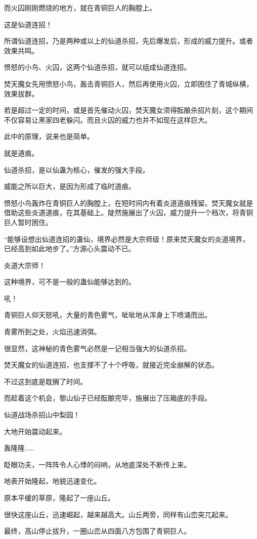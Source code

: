 \begin{this_body}
而火囚刚刚燃烧的地方，就在青铜巨人的胸膛上。

这是仙道连招！

所谓仙道连招，乃是两种或以上的仙道杀招，先后爆发后，形成的威力提升。或者效果共鸣。

愤怒的小鸟、火囚，这两个仙道杀招，就可以组成仙道连招。

焚天魔女先用愤怒小鸟，轰击青铜巨人，然后再使用火囚，立即困住了青城纵横，效果拔群。

若是超过一定的时间，或是首先催动火囚，焚天魔女须得酝酿杀招片刻，这个期间不仅容易让黑家四老躲闪。而且火囚的威力也并不如现在这样巨大。

此中的原理，说来也是简单。

就是道痕。

仙道杀招，是以仙蛊为核心，催发的强大手段。

威能之所以巨大，是因为形成了临时道痕。

愤怒小鸟轰炸在青铜巨人的胸膛上，在短时间内有着炎道道痕残留。焚天魔女就是借助这些炎道道痕，在其基础上。陡然施展出了火囚，威力提升一个档次，将青铜巨人暂时困住。

“能够设想出仙道连招的蛊仙，境界必然是大宗师级！原来焚天魔女的炎道境界，已经高到如此地步了。”方源心头震动不已。

炎道大宗师！

这种境界，可不是一般的蛊仙能够达到的。

吼！

青铜巨人仰天怒吼，大量的青色雾气，呲呲地从浑身上下喷涌而出。

青雾所到之处，火焰迅速消弭。

很显然，这神秘的青色雾气必然是一记相当强大的仙道杀招。

焚天魔女的仙道连招，也支撑不了十个呼吸，就接近完全崩解的状态。

不过这到底是耽搁了时间。

而趁着这个机会，黎山仙子已经酝酿完毕，施展出了压箱底的手段。

仙道战场杀招山中梨园！

大地开始震动起来。

轰隆隆……

眨眼功夫，一阵阵令人心悸的闷响，从地底深处不断传上来。

地表开始隆起，地貌迅速变化。

原本平缓的草原，隆起了一座山丘。

很快这座山丘，迅速崛起，越来越高大。山丘两旁，同样有山峦突兀起来。

最终，高山停止拔升，一圈山峦从四面八方包围了青铜巨人。


\end{this_body}
